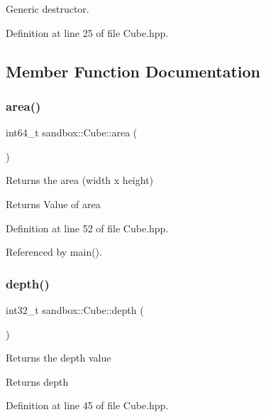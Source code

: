 Generic destructor. 



Definition at line 25 of file Cube.\+hpp.



\subsection{Member Function Documentation}
\mbox{\label{classsandbox_1_1_cube_a882672645dbe516f24f8c363730fdef0}} 
\subsubsection{\texorpdfstring{area()}{area()}}
{\footnotesize\ttfamily int64\+\_\+t sandbox\+::\+Cube\+::area (\begin{DoxyParamCaption}{ }\end{DoxyParamCaption})\hspace{0.3cm}{\ttfamily [inline]}}

Returns the area (width x height) \begin{DoxyReturn}{Returns}
Value of area 
\end{DoxyReturn}


Definition at line 52 of file Cube.\+hpp.



Referenced by main().

\mbox{\label{classsandbox_1_1_cube_aeb27ca34752f1cf66d4d8b38a4874f7c}} 
\subsubsection{\texorpdfstring{depth()}{depth()}}
{\footnotesize\ttfamily int32\+\_\+t sandbox\+::\+Cube\+::depth (\begin{DoxyParamCaption}{ }\end{DoxyParamCaption})\hspace{0.3cm}{\ttfamily [inline]}}

Returns the depth value \begin{DoxyReturn}{Returns}
depth 
\end{DoxyReturn}


Definition at line 45 of file Cube.\+hpp.


